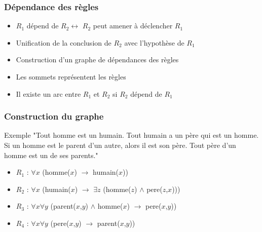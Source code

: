 
\begin{frame}
	\frametitle{Dépendance des règles}
	\begin{itemize}
		\item $R_1$ dépend de $R_2 \leftrightarrow $ $R_2$ peut amener à déclencher $R_1$
		\item Unification de la conclusion de $R_2$ avec l'hypothèse de $R_1$
		\item Construction d'un graphe de dépendances des règles
		\item Les sommets représentent les règles
		\item Il existe un arc entre $R_1$ et $R_2$ si $R_2$ dépend de $R_1$
	\end{itemize}
\end{frame}

\begin{frame}
	\frametitle{Construction du graphe}
	\begin{exampleblock}{Exemple}
		"Tout homme est un humain.
		Tout humain a un père qui est un homme.
		Si un homme est le parent d'un autre, alors il est son père.
		Tout père d'un homme est un de ses parents."

		\begin{itemize}
			\item $R_1$ : $\forall x$ (homme($x$) $\rightarrow$ humain($x$))
			\item $R_2$ : $\forall x$ (humain($x$) $\rightarrow$ $\exists z$ (homme($z$)
			$\wedge$ pere($z$,$x$)))
			\item $R_3$ : $\forall x \forall y$ (parent($x$,$y$) $\wedge$ homme($x$)
			$\rightarrow$ pere($x$,$y$))
			\item $R_4$ : $\forall x \forall y$ (pere($x$,$y$) $\rightarrow$
			parent($x$,$y$))
		\end{itemize}
	\end{exampleblock}
\end{frame}

